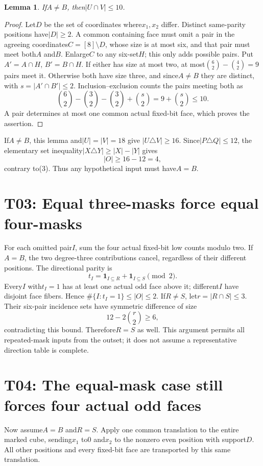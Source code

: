 \documentclass{article}
\newtheorem{lemma}{Lemma}\newtheorem{theorem}{Theorem}
\begin{document}
\begin{lemma}
If$A\ne B$, then$|U\cap V|\le10$.
\end{lemma}
\begin{proof}
Let$D$ be the set of coordinates where$x_1,x_2$ differ. Distinct
same-parity positions have$|D|\ge2$. A common containing face must
omit a pair in the agreeing coordinates$C=[8]\setminus D$, whose
size is at most six, and that pair must meet both$A$ and$B$.
Enlarge$C$ to any six-set$H$; this only adds possible pairs.
Put$A'=A\cap H$, $B'=B\cap H$. If either has size at most two,
at most$\binom62-\binom42=9$ pairs meet it. Otherwise both have
size three, and since$A\ne B$ they are distinct, with
$s=|A'\cap B'|\le2$. Inclusion--exclusion counts the pairs meeting
both as
\[
 \binom62-\binom32-\binom32+\binom s2
                         =9+\binom s2\le10.
\]
A pair determines at most one common actual fixed-bit face, which
proves the assertion.
\end{proof}
If$A\ne B$, this lemma and$|U|=|V|=18$ give
$|U\triangle V|\ge16$. Since$|P\triangle Q|\le12$, the elementary
set inequality$|X\triangle Y|\ge|X|-|Y|$ gives
\[
                         |O|\ge16-12=4,                \tag{4}
\]
contrary to(3). Thus any hypothetical input must have$A=B$.

\section{T03: Equal three-masks force equal four-masks}
For each omitted pair$I$, sum the four actual fixed-bit low counts
modulo two. If$A=B$, the two degree-three contributions cancel,
regardless of their different positions. The directional parity is
\[
       t_I=\mathbf1_{I\subseteq R}+\mathbf1_{I\subseteq S}
                                  \pmod2.               \tag{5}
\]
Every$I$ with$t_I=1$ has at least one actual odd face above it;
different$I$ have disjoint face fibers. Hence
$\#\{I:t_I=1\}\le|O|\le2$.
If$R\ne S$, let$r=|R\cap S|\le3$. Their six-pair incidence sets
have symmetric difference of size
\[
                         12-2\binom r2\ge6,             \tag{6}
\]
contradicting this bound. Therefore$R=S$ as well. This argument permits
all repeated-mask inputs from the outset; it does not assume a
representative direction table is complete.

\section{T04: The equal-mask case still forces four actual odd faces}
Now assume$A=B$ and$R=S$. Apply one common translation to the entire
marked cube, sending$x_1$ to0 and$x_2$ to the nonzero even position
with support$D$. All other positions and every fixed-bit face are
transported by this same translation.
\end{document}
